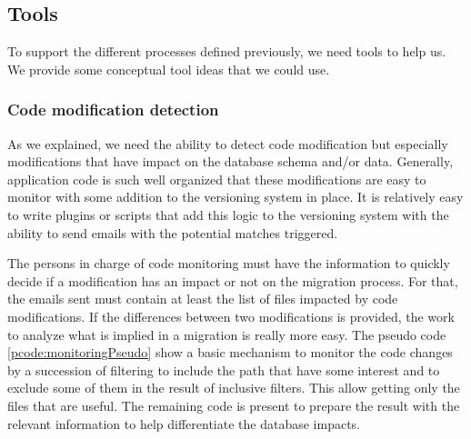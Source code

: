 \subsection{Tools}

To support the different processes defined previously, we need tools to help us. We provide some conceptual tool ideas that we could use.

\subsubsection{Code modification detection\\}

As we explained, we need the ability to detect code modification but especially modifications that have impact on the database schema and/or data. Generally, application code is such well organized that these modifications are easy to monitor with some addition to the versioning system in place. It is relatively easy to write plugins or scripts that add this logic to the versioning system with the ability to send emails with the potential matches triggered.

The persons in charge of code monitoring must have the information to quickly decide if a modification has an impact or not on the migration process. For that, the emails sent must contain at least the list of files impacted by code modifications. If the differences between two modifications is provided, the work to analyze what is implied in a migration is really more easy. The pseudo code \ref{pcode:monitoringPseudo} show a basic mechanism to monitor the code changes by a succession of filtering to include the path that have some interest and to exclude some of them in the result of inclusive filters. This allow getting only the files that are useful. The remaining code is present to prepare the result with the relevant information to help differentiate the database impacts.

